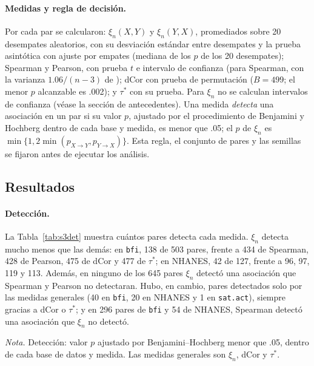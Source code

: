\documentclass[man,donotrepeattitle,floatsintext]{apa7}
\begin{document}
\paragraph{Medidas y regla de decisión.} Por cada par se calcularon: $\xi_n(X,Y)$ y $\xi_n(Y,X)$, promediados sobre 20 desempates aleatorios, con su desviación estándar entre desempates y la prueba asintótica con ajuste por empates (mediana de los $p$ de los 20 desempates); Spearman y Pearson, con prueba $t$ e intervalo de confianza (para Spearman, con la varianza $1.06/(n-3)$ de \cite{fieller1957}); dCor con prueba de permutación ($B=499$; el menor $p$ alcanzable es .002); y $\tau^*$ con su prueba. Para $\xi_n$ no se calculan intervalos de confianza (véase la sección de antecedentes). Una medida \emph{detecta} una asociación en un par si su valor $p$, ajustado por el procedimiento de Benjamini y Hochberg \parencite{benjamini1995} dentro de cada base y medida, es menor que .05; el $p$ de $\xi_n$ es $\min\{1,2\min(p_{X\to Y},p_{Y\to X})\}$. Esta regla, el conjunto de pares y las semillas se fijaron antes de ejecutar los análisis.

\subsection{Resultados}

\paragraph{Detección.} La Tabla~\ref{tab:s3det} muestra cuántos pares detecta cada medida. $\xi_n$ detecta mucho menos que las demás: en \texttt{bfi}, 138 de 503 pares, frente a 434 de Spearman, 428 de Pearson, 475 de dCor y 477 de $\tau^*$; en NHANES, 42 de 127, frente a 96, 97, 119 y 113. Además, en ninguno de los 645 pares $\xi_n$ detectó una asociación que Spearman y Pearson no detectaran. Hubo, en cambio, pares detectados solo por las medidas generales (40 en \texttt{bfi}, 20 en NHANES y 1 en \texttt{sat.act}), siempre gracias a dCor o $\tau^*$; y en 296 pares de \texttt{bfi} y 54 de NHANES, Spearman detectó una asociación que $\xi_n$ no detectó.

\begin{table}
\caption{Pares de variables en que cada medida detecta una asociación}
\label{tab:s3det}
\begin{threeparttable}
\small

\begin{tablenotes}[flushleft]
\small
\item \textit{Nota.} Detección: valor $p$ ajustado por Benjamini--Hochberg menor que .05, dentro de cada base de datos y medida. Las medidas generales son $\xi_n$, dCor y $\tau^*$.
\end{tablenotes}
\end{threeparttable}
\end{table}
\end{document}
